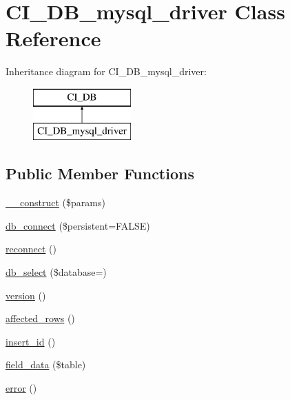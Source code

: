 \hypertarget{class_c_i___d_b__mysql__driver}{}\section{C\+I\+\_\+\+D\+B\+\_\+mysql\+\_\+driver Class Reference}
\label{class_c_i___d_b__mysql__driver}
Inheritance diagram for C\+I\+\_\+\+D\+B\+\_\+mysql\+\_\+driver\+:\begin{figure}[H]
\begin{center}
\leavevmode
\includegraphics[height=2.000000cm]{class_c_i___d_b__mysql__driver}
\end{center}
\end{figure}
\subsection*{Public Member Functions}
\begin{DoxyCompactItemize}
\item 
\mbox{\hyperlink{class_c_i___d_b__mysql__driver_a86b2c3a2e1278df844deef6db237a708}{\+\_\+\+\_\+construct}} (\$params)
\item 
\mbox{\hyperlink{class_c_i___d_b__mysql__driver_a801b5e005b7b0ba495dfb03404226b36}{db\+\_\+connect}} (\$persistent=F\+A\+L\+SE)
\item 
\mbox{\hyperlink{class_c_i___d_b__mysql__driver_a62856c8b8569fb9c79ae6c14a6e7c05f}{reconnect}} ()
\item 
\mbox{\hyperlink{class_c_i___d_b__mysql__driver_a578463fcc5c1123c0886e2c5271dd202}{db\+\_\+select}} (\$database=\textquotesingle{}\textquotesingle{})
\item 
\mbox{\hyperlink{class_c_i___d_b__mysql__driver_aa383231e6810b0779e02a1fbf09ebc93}{version}} ()
\item 
\mbox{\hyperlink{class_c_i___d_b__mysql__driver_a9e25e79c0cf70de5c52b5fc739e77646}{affected\+\_\+rows}} ()
\item 
\mbox{\hyperlink{class_c_i___d_b__mysql__driver_ae0b4206f790de276d05fb6f8f20a1556}{insert\+\_\+id}} ()
\item 
\mbox{\hyperlink{class_c_i___d_b__mysql__driver_af29e284d91510dbbdd858e69dced2636}{field\+\_\+data}} (\$table)
\item 
\mbox{\hyperlink{class_c_i___d_b__mysql__driver_a36e98a313e685ab9ef489b38946f1a52}{error}} ()
\end{DoxyCompactItemize}
